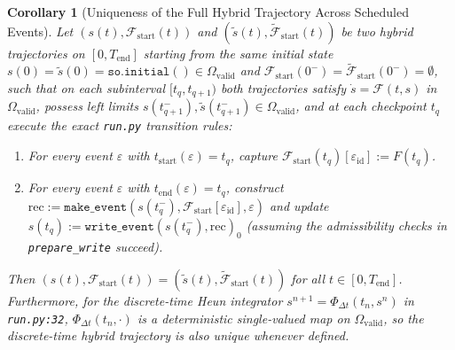 \documentclass[11pt,a4paper]{article}
\newtheorem{corollary}[theorem]{Corollary}
\theoremstyle{definition}
\begin{document}
\begin{corollary}[Uniqueness of the Full Hybrid Trajectory Across Scheduled Events]
\label{cor:hybrid}
Let $(s(t), \mathcal{F}_{\mathrm{start}}(t))$ and $(\widetilde{s}(t), \widetilde{\mathcal{F}}_{\mathrm{start}}(t))$ be two hybrid trajectories on $[0, T_{\mathrm{end}}]$ starting from the same initial state $s(0) = \widetilde{s}(0) = \texttt{so.initial}() \in \Omega_{\mathrm{valid}}$ and $\mathcal{F}_{\mathrm{start}}(0^-) = \widetilde{\mathcal{F}}_{\mathrm{start}}(0^-) = \emptyset$, such that on each subinterval $[t_q, t_{q+1})$ both trajectories satisfy $\dot{s} = \mathcal{F}(t, s)$ in $\Omega_{\mathrm{valid}}$, possess left limits $s(t_{q+1}^-), \widetilde{s}(t_{q+1}^-) \in \Omega_{\mathrm{valid}}$, and at each checkpoint $t_q$ execute the exact \texttt{run.py} transition rules:
\begin{enumerate}
  \item For every event $\varepsilon$ with $t_{\mathrm{start}}(\varepsilon) = t_q$, capture $\mathcal{F}_{\mathrm{start}}(t_q)[\varepsilon_{\mathrm{id}}] := F(t_q)$.
  \item For every event $\varepsilon$ with $t_{\mathrm{end}}(\varepsilon) = t_q$, construct $\mathrm{rec} := \texttt{make\_event}(s(t_q^-), \mathcal{F}_{\mathrm{start}}[\varepsilon_{\mathrm{id}}], \varepsilon)$ and update $s(t_q) := \texttt{write\_event}(s(t_q^-), \mathrm{rec})_0$ (assuming the admissibility checks in \texttt{prepare\_write} succeed).
\end{enumerate}
Then $(s(t), \mathcal{F}_{\mathrm{start}}(t)) = (\widetilde{s}(t), \widetilde{\mathcal{F}}_{\mathrm{start}}(t))$ for all $t \in [0, T_{\mathrm{end}}]$. Furthermore, for the discrete-time Heun integrator $s^{n+1} = \Phi_{\Delta t}(t_n, s^n)$ in \texttt{run.py:32}, $\Phi_{\Delta t}(t_n, \cdot)$ is a deterministic single-valued map on $\Omega_{\mathrm{valid}}$, so the discrete-time hybrid trajectory is also unique whenever defined.
\end{corollary}
\end{document}
